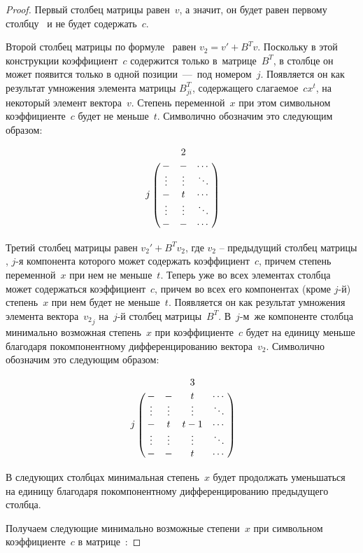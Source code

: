 \begin{proof}
Первый столбец матрицы \diffMatrix[B] равен~$v$, а значит, он будет равен первому столбцу \diffMatrix\ и не будет содержать~$c$.

Второй столбец матрицы \diffMatrix[B] по формуле~ равен $v_2 = v' + {B}^Tv$. Поскольку в этой конструкции коэффициент~$c$ 
содержится только в~матрице~${B}^T$, в столбце он может появится только в одной позиции~---~под номером~$j$. Появляется он как результат умножения
элемента матрицы $B^{T}_{ji}$, содержащего слагаемое~$cx^t$, на некоторый элемент вектора~$v$. Степень переменной~$x$ при этом символьном коэффициенте~$c$
будет не меньше~$t$. Символично обозначим это следующим образом:

\begin{equation*}
    \bordermatrix{
		&           & 2       &        \cr
		&   -       & -       & \cdots \cr
		&   \vdots  & \vdots  & \ddots \cr
		j & -       & t       & \cdots \cr
		&   \vdots  & \vdots  & \ddots \cr
		&   -       & -       & \cdots \cr
	}
\end{equation*}

Третий столбец матрицы равен $v_2' + {B}^Tv_2$, где $v_2$ -- предыдущий столбец матрицы \diffMatrix[B], $j$-я компонента которого может содержать коэффициент~$c$,
причем степень переменной~$x$ при нем не меньше~$t$.
Теперь уже во всех элементах столбца может содержаться коэффициент~$c$, причем во всех его компонентах (кроме $j$-й) степень~$x$ при нем будет не меньше~$t$.
Появляется он как результат умножения элемента вектора~${v_2}_j$ на~$j$-й столбец матрицы~$B^T$.
В~$j$-м~же компоненте столбца минимально возможная степень~$x$ при коэффициенте~$c$ будет на единицу меньше благодаря покомпонентному дифференцированию вектора~$v_2$.
Символично обозначим это следующим образом:

\begin{equation*}
    \bordermatrix{
		&           &         & 3      &        \cr
		&   -       & -       & t      & \cdots \cr
		&   \vdots  & \vdots  & \vdots & \ddots \cr
		j & -       & t       & t - 1  & \cdots \cr
		&   \vdots  & \vdots  & \vdots & \ddots \cr
		&   -       & -       & t      & \cdots \cr
	}
\end{equation*}

В следующих столбцах минимальная степень~$x$ будет продолжать уменьшаться на единицу благодаря покомпонентному дифференцированию предыдущего столбца.

Получаем следующие минимально возможные степени~$x$ при символьном коэффициенте~$c$ в матрице~\diffMatrix[B]:


\end{proof}
